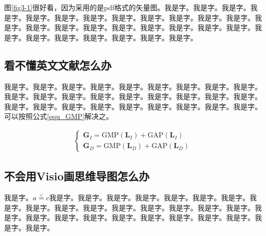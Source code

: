 \documentclass[supercite]{Experimental_Report}
\theoremstyle{definition}
\begin{document}
图\ref{fig3-1}很好看，因为采用的是pdf格式的矢量图。我是字。我是字。我是字。我是字。我是字。我是字。我是字。我是字。我是字。我是字。我是字。我是字。我是字。我是字。我是字。我是字。我是字。我是字。我是字。我是字。我是字。我是字。我是字。我是字。我是字。我是字。我是字。我是字。

\subsection{看不懂英文文献怎么办}

我是字。我是字。我是字。我是字。我是字。我是字。我是字。我是字。我是字。我是字。我是字。我是字。我是字。我是字。我是字。我是字。我是字。我是字。我是字。我是字。我是字。我是字。我是字。我是字。我是字。我是字。我是字。可以按照公式\ref{equ_GMP}解决之。

\begin{eqnarray}\label{equ_GMP}
	\begin{cases}
		\textbf{G}_I=\mathrm{GMP}(\textbf{L}_I) + \mathrm{GAP}(\textbf{L}_I)\\
		\textbf{G}_D=\mathrm{GMP}(\textbf{L}_D) + \mathrm{GAP}(\textbf{L}_D)
	\end{cases}
\end{eqnarray}{}

\subsection{不会用Visio画思维导图怎么办}

我是字。$a\stackrel{<}{=}c$我是字。我是字。我是字。我是字。我是字。我是字。我是字。我是字。我是字。我是字。我是字。我是字。我是字。我是字。我是字。我是字。我是字。我是字。我是字。我是字。我是字。我是字。我是字。我是字。我是字。我是字。我是字。
\end{document}
